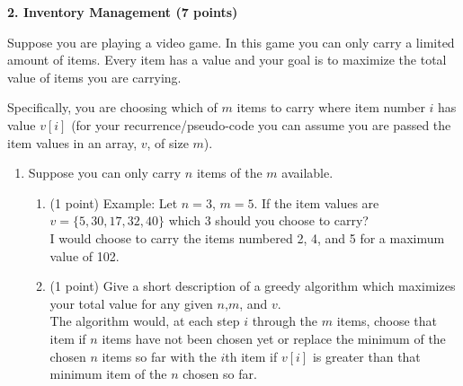 \documentclass[12pt]{elsart}
\begin{document}
{\bf 2.  Inventory Management (7 points)}

Suppose you are playing a video game.  In this game you can only carry a limited amount of items.  Every item has a value and your goal is to maximize the total value of items you are carrying.  

Specifically, you are choosing which of $m$ items to carry where item number $i$ has value $v[i]$ (for your recurrence/pseudo-code you can assume you are passed the item values  in an array, $v$, of size $m$).  

\begin{enumerate}
   \item Suppose you can only carry $n$ items of the $m$ available.
   \begin{enumerate}
      \item (1 point) Example: Let $n=3$, $m=5$.  If the item values are $v=\{5,30,17,32,40\}$ which $3$ should you choose to carry?\\
          I would choose to carry the items numbered 2, 4, and 5 for a maximum value of 102.
      \item (1 point) Give a short description of a greedy algorithm which maximizes your total value for any given $n$,$m$, and $v$.\\
          The algorithm would, at each step $i$ through the $m$ items, choose that item if $n$ items have not been chosen yet or replace the minimum of the chosen $n$ items so far with the $i$th item if $v[i]$ is greater than that minimum item of the $n$ chosen so far.
   \end{enumerate}


\end{enumerate}
\end{document}
